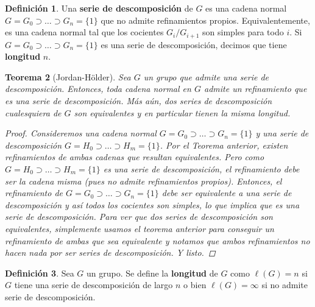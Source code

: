 \documentclass[12pt]{book}
\newtheorem{teo}{Teorema}[section]
\theoremstyle{definition}
\newtheorem{defn}[teo]{Definición}
\begin{document}
\begin{defn}
Una \textbf{serie de descomposición} de $G$ es una cadena normal $G=G_0\supset\ldots\supset G_n=\{1\}$ que no admite refinamientos propios. Equivalentemente, es una cadena normal tal que los cocientes $G_i/G_{i+1}$ son simples para todo $i$. Si $G=G_0\supset\ldots \supset G_n=\{1\}$ es una serie de descomposición, decimos que tiene \textbf{longitud} $n$.
\end{defn}

\begin{teo}[Jordan-Hölder]
Sea $G$ un grupo que admite una serie de descomposición. Entonces, toda cadena normal en $G$ admite un refinamiento que es una serie de descomposición. Más aún, dos series de descomposición cualesquiera de $G$ son equivalentes y en particular tienen la misma longitud.
\begin{proof}
Consideremos una cadena normal $G=G_0\supset\ldots\supset G_n=\{1\}$ y una serie de descomposición $G=H_0\supset\ldots\supset H_m=\{1\}$. Por el Teorema anterior, existen refinamientos de ambas cadenas que resultan equivalentes. Pero como $G=H_0\supset\ldots\supset H_m=\{1\}$ es una serie de descomposición, el refinamiento debe ser la cadena misma (pues no admite refinamientos propios). Entonces, el refinamiento de $G=G_0\supset\ldots\supset G_n=\{1\}$ debe ser equivalente a una serie de descomposición y así todos los cocientes son simples, lo que implica que es una serie de descomposición. Para ver que dos series de descomposición son equivalentes, simplemente usamos el teorema anterior para conseguir un refinamiento de ambas que sea equivalente y notamos que ambos refinamientos no hacen nada por ser series de descomposición. Y listo.
\end{proof}
\end{teo}

\begin{defn}
Sea $G$ un grupo. Se define la \textbf{longitud} de $G$ como $\ell(G) = n$ si $G$ tiene una serie de descomposición de largo $n$ o bien $\ell(G)=\infty$ si no admite serie de descomposición.
\end{defn}
\end{document}
